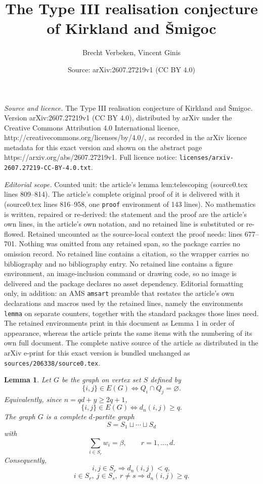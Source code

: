 \documentclass[10pt,a4paper]{amsart}
\title{The Type III realisation conjecture of Kirkland and \v{S}migoc}
\author{Brecht Verbeken, Vincent Ginis}
\date{Source: arXiv:2607.27219v1 (CC BY 4.0)}
\newtheorem{lemma}{Lemma}
\begin{document}
\maketitle

\noindent\emph{Source and licence.} The Type III realisation conjecture of Kirkland and \v{S}migoc. Version arXiv:2607.27219v1 (CC BY 4.0), distributed by arXiv under the Creative Commons Attribution 4.0 International licence, http://creativecommons.org/licenses/by/4.0/, as recorded in the arXiv licence metadata for this exact version and shown on the abstract page https://arxiv.org/abs/2607.27219v1. Full licence notice: \texttt{licenses/arxiv-2607.27219-CC-BY-4.0.txt}.\par\smallskip

\noindent\textit{Editorial scope.} Counted unit: the article's lemma lem:telescoping (source0.tex lines 809--814). The article's complete original proof of it is delivered with it (source0.tex lines 816--958, one \texttt{proof} environment of 143 lines). No mathematics is written, repaired or re-derived: the statement and the proof are the article's own lines, in the article's own notation, and no retained line is substituted or re-flowed.  Retained uncounted as the source-local context the proof needs: lines 677--701.  Nothing was omitted from any retained span, so the package carries no omission record.  No retained line contains a citation, so the wrapper carries no bibliography and no bibliography entry.  No retained line contains a figure environment, an image-inclusion command or drawing code, so no image is delivered and the package declares no asset dependency.  Editorial formatting only, in addition: an AMS \texttt{amsart} preamble that restates the article's own declarations and macros used by the retained lines, namely the environments \texttt{lemma} on separate counters, together with the standard packages those lines need.  The retained environments print in this document as Lemma 1 in order of appearance, whereas the article prints the same items with the numbering of its own full document.  The complete native source of the article as distributed in the arXiv e-print for this exact version is bundled unchanged as \texttt{sources/206338/source0.tex}.
\begin{lemma}\label{lem:turan-step}
Let $G$ be the graph on vertex set $S$ defined by
\[
        \{i,j\}\in E(G)\Longleftrightarrow Q_i\cap Q_j=\varnothing.
\]
Equivalently, since $n=qd+y\ge2q+1$,
\begin{equation}
        \{i,j\}\in E(G) \Longleftrightarrow d_n(i,j)\ge q. \label{eq:dist}
\end{equation}
The graph $G$ is a complete $d$-partite graph
\[
        S=S_1\sqcup\cdots\sqcup S_d
\]
with
\[
        \sum_{i\in S_r}w_i=\beta,\qquad r=1,\ldots,d.
\]
Consequently,
\[
        i,j\in S_r \Longrightarrow d_n(i,j)<q,
\]
\[
        i\in S_r,\ j\in S_s,\ r\ne s \Longrightarrow d_n(i,j)\ge q.
\]
\end{lemma}
\end{document}

